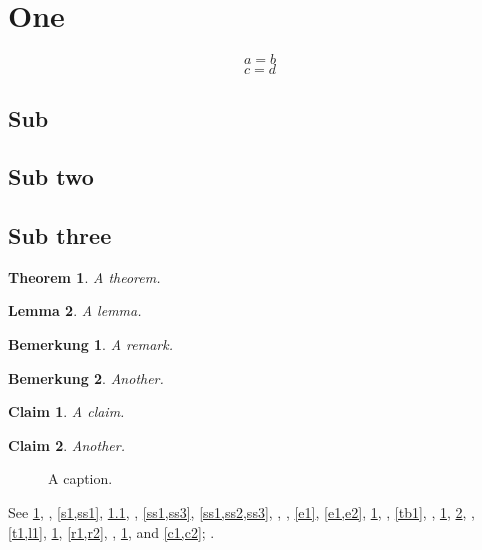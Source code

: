 \documentclass{article}
\newtheorem{theorem}{Theorem}
\newtheorem{lemma}[theorem]{Lemma}
\newtheorem{remark}{Bemerkung}
\newtheorem{claim}{Claim}
\begin{document}
\section{One}\label{s1}
\begin{equation}\label{e1}
a = b
\end{equation}
\begin{equation}\label{e2}
c = d
\end{equation}
\subsection{Sub}\label{ss1}
\subsection{Sub two}\label{ss2}
\subsection{Sub three}\label{ss3}
\begin{theorem}\label{t1}
A theorem.
\end{theorem}
\begin{lemma}\label{l1}
A lemma.
\end{lemma}
\begin{remark}\label{r1}
A remark.
\end{remark}
\begin{remark}\label{r2}
Another.
\end{remark}
\begin{claim}\label{c1}
A claim.
\end{claim}
\begin{claim}\label{c2}
Another.
\end{claim}
\begin{figure}[h]
\centering
\caption{A caption.}\label{f1}
\end{figure}
\begin{table}[h]
\centering
\caption{A table.}\label{tb1}
\end{table}
See \cref{s1}, , \cref{s1,ss1}, \cref{ss1}, , \cref{ss1,ss3}, \cref{ss1,ss2,ss3}, , , \cref{e1}, \cref{e1,e2}, \cref{f1}, , \cref{tb1}, , \cref{t1}, \cref{l1}, , \cref{t1,l1}, \cref{r1}, \cref{r1,r2}, , \cref{c1},  and \cref{c1,c2}; .
\end{document}
